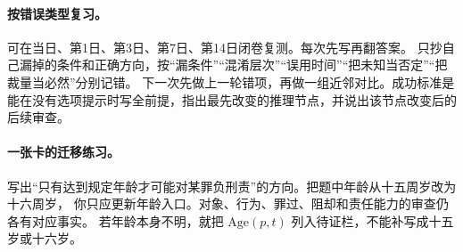 \paragraph{按错误类型复习。}
可在当日、第1日、第3日、第7日、第14日闭卷复测。每次先写再翻答案。
只抄自己漏掉的条件和正确方向，按“漏条件”“混淆层次”“误用时间”“把未知当否定”“把裁量当必然”分别记错。
下一次先做上一轮错项，再做一组近邻对比。成功标准是能在没有选项提示时写全前提，指出最先改变的推理节点，并说出该节点改变后的后续审查。

\paragraph{一张卡的迁移练习。}
写出“只有达到规定年龄才可能对某罪负刑责”的方向。把题中年龄从十五周岁改为十六周岁，
你只应更新年龄入口。对象、行为、罪过、阻却和责任能力的审查仍各有对应事实。
若年龄本身不明，就把 $\mathrm{Age}(p,t)$ 列入待证栏，不能补写成十五岁或十六岁。
